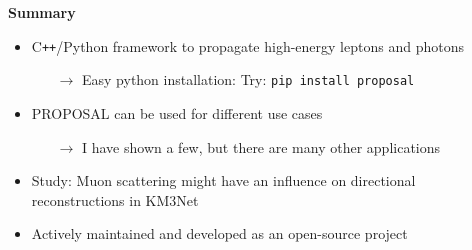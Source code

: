 
\begin{frame}[c]
    \begin{columns}[onlytextwidth]
        \begin{column}{0.7\textwidth}
            \textbf{Summary}
            \begin{itemize}
                \item C\texttt{++}/Python framework to propagate high-energy leptons and photons 
                \begin{itemize}
                    \item[$\rightarrow$] Easy python installation: Try: \texttt{pip install proposal}
                \end{itemize}
                \item PROPOSAL can be used for different use cases
                \begin{itemize}
                    \item[$\rightarrow$] I have shown a few, but there are many other applications
                \end{itemize}
                \item Study: Muon scattering might have an influence on directional reconstructions in KM3Net
                \item Actively maintained and developed as an open-source project
            \end{itemize}



\end{column}
\end{columns}
\end{frame}
